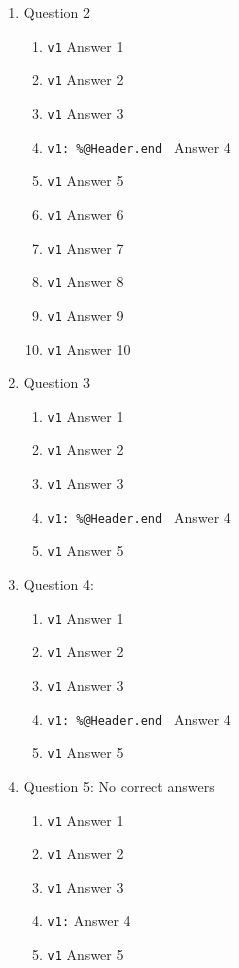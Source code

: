 \documentclass{article}%
\begin{document}
\begin{enumerate}
\item Question 2
\begin{enumerate}
	\item \verb+v1+ Answer 1
	\item \verb+v1+ Answer 2
	\item \verb+v1+ Answer 3
	\item \verb+v1: %@Header.end + Answer 4 %
	\item \verb+v1+ Answer 5
	\item \verb+v1+ Answer 6
	\item \verb+v1+ Answer 7
	\item \verb+v1+ Answer 8		%
	\item \verb+v1+ Answer 9
	\item \verb+v1+ Answer 10	
\end{enumerate}

\item Question 3
\begin{enumerate}
	\item \verb+v1+ Answer 1
	\item \verb+v1+ Answer 2
	\item \verb+v1+ Answer 3
	\item \verb+v1: %@Header.end + Answer 4 %
	\item \verb+v1+ Answer 5
\end{enumerate}

\item Question 4:
\begin{enumerate}
	\item \verb+v1+ Answer 1
	\item \verb+v1+ Answer 2
	\item \verb+v1+ Answer 3
	\item \verb+v1: %@Header.end + Answer 4 %
	\item \verb+v1+ Answer 5
\end{enumerate}

\item Question 5: No correct answers
\begin{enumerate}
	\item \verb+v1+ Answer 1
	\item \verb+v1+ Answer 2
	\item \verb+v1+ Answer 3
	\item \verb+v1:+ Answer 4 
	\item \verb+v1+ Answer 5
\end{enumerate}



\end{enumerate}
\end{document}
